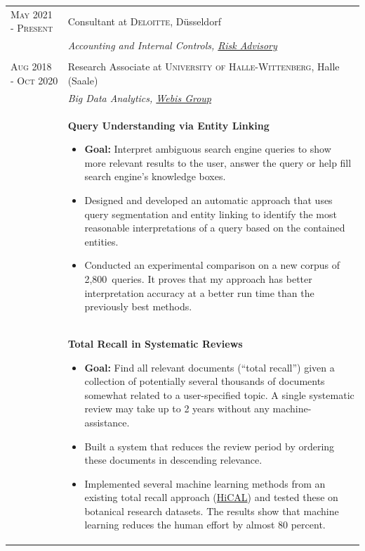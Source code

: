 \documentclass[a4paper,10pt]{article} %
\begin{document}
\begin{longtable}{l p{11cm}}
\textsc{May 2021 - Present} & Consultant at \textsc{Deloitte}, Düsseldorf\\
& \emph{Accounting and Internal Controls, \href{https://www2.deloitte.com/de/de/services/risk.html?icid=bottom_risk}{Risk Advisory}}\\
\multicolumn{2}{c}{} \\

\textsc{Aug 2018 - Oct 2020} & Research Associate at \textsc{University of Halle-Wittenberg}, Halle (Saale)
\\
& \emph{Big Data Analytics, \href{https://webis.de}{Webis Group}}\\[1mm]
& \textbf{\footnotesize{Query Understanding via Entity Linking}}\vspace{0.2em}
  {\footnotesize
  	\begin{itemize}
  		\setlength\itemsep{0.2em}
 		\item \textbf{Goal:} Interpret ambiguous search engine queries to show more relevant results to the user, answer the query or help fill search engine's knowledge boxes. 
 		\item Designed and developed an automatic approach that uses query segmentation and entity linking to identify the most reasonable interpretations of a query based on the contained entities. 
		\item Conducted an experimental comparison on a new corpus of 2,800~queries. It proves that my approach has better interpretation accuracy at a better run time than the previously best methods.    
  \end{itemize}
  }
\\[-2mm]
& \textbf{\footnotesize{Total Recall in Systematic Reviews}}\vspace{0.2em}
  {\footnotesize
  	\begin{itemize}
  		\setlength\itemsep{0.2em}
 		\item \textbf{Goal:} Find all relevant documents (“total recall”) given a collection of potentially several thousands of documents somewhat related to a user-specified topic. A single systematic review may take up to 2 years without any machine-assistance. 
 		\item Built a system that reduces the review period by ordering these documents in descending relevance. 
 		\item Implemented several machine learning methods from an existing total recall approach (\href{https://github.com/hical/HiCAL}{HiCAL}) and tested these on botanical research datasets. The results show that machine learning reduces the human effort by almost 80 percent. 

\end{itemize}}
\end{longtable}
\end{document}
